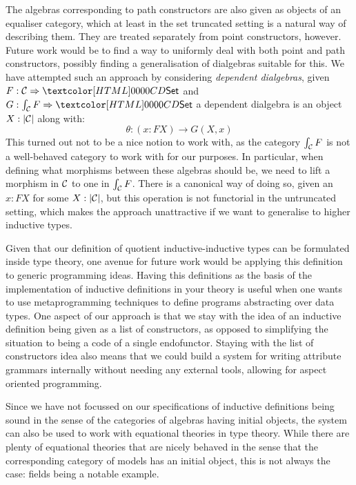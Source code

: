 The algebras corresponding to path constructors are also given as
objects of an equaliser category, which at least in the set truncated
setting is a natural way of describing them. They are treated
separately from point constructors, however. Future work would be to
find a way to uniformly deal with both point and path constructors,
possibly finding a generalisation of dialgebras suitable for this. We
have attempted such an approach by considering \emph{dependent
  dialgebras}, \ie given $F : \Func{\Cc}{\Set}$ and
$G : \Func{\int_{\Cc} F}{\Set}$ a dependent dialgebra is an object
$X : | \mathcal{C} |$ along with:
$$
\theta : (x : FX) \to G (X , x)
$$
This turned out not to be a nice notion to work with, as the category
$\int_{\mathcal{C}} F$ is not a well-behaved category to work with for our
purposes. In particular, when defining what morphisms between these
algebras should be, we need to lift a morphism in $\mathcal{C}$ to one in
$\int_{\mathcal{C}} F$. There is a canonical way of doing so, given an
$x : FX$ for some $X : | \mathcal{C} |$, but this operation is not functorial
in the untruncated setting, which makes the approach unattractive if
we want to generalise to higher inductive types.

Given that our definition of quotient inductive-inductive types can be
formulated inside type theory, one avenue for future work would be
applying this definition to generic programming ideas. Having this
definitions as the basis of the implementation of inductive
definitions in your theory is useful when one wants to use
metaprogramming techniques to define programs abstracting over data
types. One aspect of our approach is that we stay with the idea of an
inductive definition being given as a list of constructors, as opposed
to simplifying the situation to being a code of a single
endofunctor. Staying with the list of constructors idea also means
that we could build a system for writing attribute grammars internally
without needing any external tools, allowing for aspect oriented
programming.

Since we have not focussed on our specifications of inductive
definitions being sound in the sense of the categories of algebras
having initial objects, the system can also be used to work with
equational theories in type theory. While there are plenty of
equational theories that are nicely behaved in the sense that the
corresponding category of models has an initial object, this is not
always the case: fields being a notable example.

